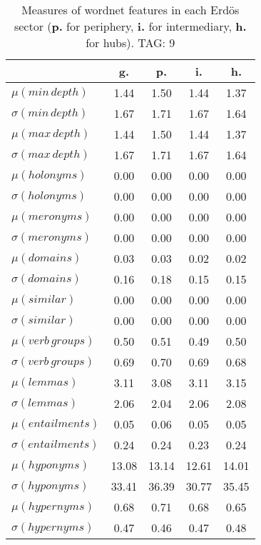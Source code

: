 \begin{table}[h!]
\begin{center}
\begin{tabular}{| l || c | c | c | c |}\hline
 & {\bf g.} & {\bf p.} & {\bf i.} & {\bf h.} \\\hline\hline
$\mu(min\,depth)$ & 1.44  & 1.50  & 1.44  & 1.37 \\
$\sigma(min\,depth)$ & 1.67  & 1.71  & 1.67  & 1.64 \\\hline
$\mu(max\,depth)$ & 1.44  & 1.50  & 1.44  & 1.37 \\
$\sigma(max\,depth)$ & 1.67  & 1.71  & 1.67  & 1.64 \\\hline
$\mu(holonyms)$ & 0.00  & 0.00  & 0.00  & 0.00 \\
$\sigma(holonyms)$ & 0.00  & 0.00  & 0.00  & 0.00 \\\hline
$\mu(meronyms)$ & 0.00  & 0.00  & 0.00  & 0.00 \\
$\sigma(meronyms)$ & 0.00  & 0.00  & 0.00  & 0.00 \\\hline
$\mu(domains)$ & 0.03  & 0.03  & 0.02  & 0.02 \\
$\sigma(domains)$ & 0.16  & 0.18  & 0.15  & 0.15 \\\hline
$\mu(similar)$ & 0.00  & 0.00  & 0.00  & 0.00 \\
$\sigma(similar)$ & 0.00  & 0.00  & 0.00  & 0.00 \\\hline
$\mu(verb\,groups)$ & 0.50  & 0.51  & 0.49  & 0.50 \\
$\sigma(verb\,groups)$ & 0.69  & 0.70  & 0.69  & 0.68 \\\hline
$\mu(lemmas)$ & 3.11  & 3.08  & 3.11  & 3.15 \\
$\sigma(lemmas)$ & 2.06  & 2.04  & 2.06  & 2.08 \\\hline
$\mu(entailments)$ & 0.05  & 0.06  & 0.05  & 0.05 \\
$\sigma(entailments)$ & 0.24  & 0.24  & 0.23  & 0.24 \\\hline
$\mu(hyponyms)$ & 13.08  & 13.14  & 12.61  & 14.01 \\
$\sigma(hyponyms)$ & 33.41  & 36.39  & 30.77  & 35.45 \\\hline
$\mu(hypernyms)$ & 0.68  & 0.71  & 0.68  & 0.65 \\
$\sigma(hypernyms)$ & 0.47  & 0.46  & 0.47  & 0.48 \\\hline
\end{tabular}
\caption{Measures of wordnet features in each Erd\"os sector ({{\bf p.}} for periphery, {{\bf i.}} for intermediary, {{\bf h.}} for hubs). TAG: 9}
\end{center}
\end{table}